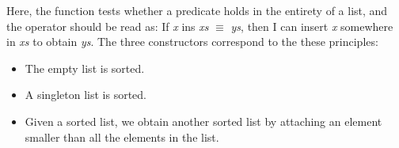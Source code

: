 \documentclass[12pt,twoside,notitlepage]{report}
\begin{document}
\begin{code}
\\
\>[0]\<[2]%
\>[2]  \AgdaSymbol{:} \AgdaSymbol{\{} \AgdaSymbol{:} \AgdaSymbol{\}}       \<%
\\
\>[2]\<[4]%
\>[4]\AgdaInductiveConstructor{[]} \AgdaSymbol{:}  \AgdaInductiveConstructor{[]}\<%
\\
\>[2]\<[4]%
\>[4]\AgdaInductiveConstructor{[\_]} \AgdaSymbol{:} \AgdaSymbol{(} \AgdaSymbol{:} \AgdaSymbol{)}   \AgdaSymbol{(}  \AgdaInductiveConstructor{[]}\AgdaSymbol{)}\<%
\\
\>[2]\<[4]%
\>[4] \AgdaSymbol{:}  \AgdaSymbol{\{} \AgdaSymbol{:} \AgdaSymbol{\}} \AgdaSymbol{\{} \AgdaSymbol{:}   \AgdaSymbol{\}} \AgdaSymbol{\{}\AgdaSymbol{\}}\<%
\\
\>[4]\<[10]%
\>[10] \AgdaSymbol{(} \AgdaSymbol{:} \AgdaSymbol{)}\<%
\\
\>[4]\<[10]%
\>[10] \AgdaSymbol{(} \AgdaSymbol{:}  \AgdaSymbol{)}\<%
\\
\>[4]\<[10]%
\>[10] \AgdaSymbol{(}      \AgdaSymbol{)}   \AgdaSymbol{)}\<%
\\
\>[4]\<[10]%
\>[10] \AgdaSymbol{(}    \AgdaSymbol{)}\<%
\\
\>[4]\<[10]%
\>[10] \AgdaSymbol{(} \AgdaSymbol{)}\<%
\\
\end{code}

Here, the  function tests whether a predicate holds in the entirety of a list, and the  operator should be read as: If \textit{x} ins \textit{xs} $\equiv$ \textit{ys}, then I can insert \textit{x} somewhere in \textit{xs} to obtain \textit{ys}. The three constructors correspond to the these principles: 
\begin{itemize}
\item The empty list is sorted.
\item A singleton list is sorted.
\item Given a sorted list, we obtain another sorted list by attaching an element smaller than all the elements in the list.
\end{itemize}
\end{document}
